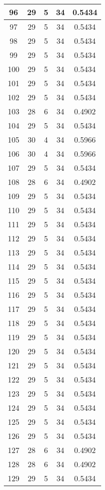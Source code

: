 \documentclass[letterpaper, 12pt]{article}
\begin{document}
\begin{longtable}{|c|c|c|c|c|}
\hline
96 & 29 & 5 & 34 & 0.5434 \\
\hline
97 & 29 & 5 & 34 & 0.5434 \\
\hline
98 & 29 & 5 & 34 & 0.5434 \\
\hline
99 & 29 & 5 & 34 & 0.5434 \\
\hline
100 & 29 & 5 & 34 & 0.5434 \\
\hline
101 & 29 & 5 & 34 & 0.5434 \\
\hline
102 & 29 & 5 & 34 & 0.5434 \\
\hline
103 & 28 & 6 & 34 & 0.4902 \\
\hline
104 & 29 & 5 & 34 & 0.5434 \\
\hline
105 & 30 & 4 & 34 & 0.5966 \\
\hline
106 & 30 & 4 & 34 & 0.5966 \\
\hline
107 & 29 & 5 & 34 & 0.5434 \\
\hline
108 & 28 & 6 & 34 & 0.4902 \\
\hline
109 & 29 & 5 & 34 & 0.5434 \\
\hline
110 & 29 & 5 & 34 & 0.5434 \\
\hline
111 & 29 & 5 & 34 & 0.5434 \\
\hline
112 & 29 & 5 & 34 & 0.5434 \\
\hline
113 & 29 & 5 & 34 & 0.5434 \\
\hline
114 & 29 & 5 & 34 & 0.5434 \\
\hline
115 & 29 & 5 & 34 & 0.5434 \\
\hline
116 & 29 & 5 & 34 & 0.5434 \\
\hline
117 & 29 & 5 & 34 & 0.5434 \\
\hline
118 & 29 & 5 & 34 & 0.5434 \\
\hline
119 & 29 & 5 & 34 & 0.5434 \\
\hline
120 & 29 & 5 & 34 & 0.5434 \\
\hline
121 & 29 & 5 & 34 & 0.5434 \\
\hline
122 & 29 & 5 & 34 & 0.5434 \\
\hline
123 & 29 & 5 & 34 & 0.5434 \\
\hline
124 & 29 & 5 & 34 & 0.5434 \\
\hline
125 & 29 & 5 & 34 & 0.5434 \\
\hline
126 & 29 & 5 & 34 & 0.5434 \\
\hline
127 & 28 & 6 & 34 & 0.4902 \\
\hline
128 & 28 & 6 & 34 & 0.4902 \\
\hline
129 & 29 & 5 & 34 & 0.5434 \\

\end{longtable}
\end{document}
